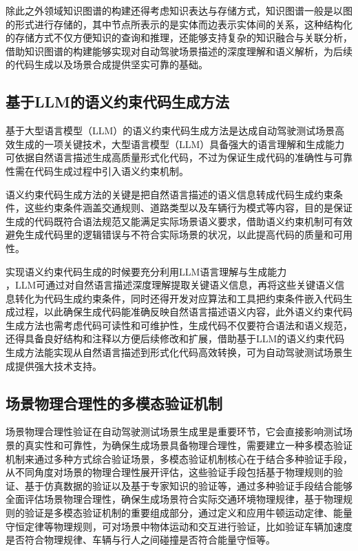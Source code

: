 除此之外领域知识图谱的构建还得考虑知识表达与存储方式，知识图谱一般是以图的形式进行存储的\cite{Yao2022React}，其中节点所表示的是实体而边表示实体间的关系，这种结构化的存储方式不仅方便知识的查询和推理，还能够支持复杂的知识融合与关联分析，借助知识图谱的构建能够实现对自动驾驶场景描述的深度理解和语义解析，为后续的代码生成以及场景合成提供坚实可靠的基础。

\subsection{基于LLM的语义约束代码生成方法}
基于大型语言模型（LLM）的语义约束代码生成方法是达成自动驾驶测试场景高效生成的一项关键技术，大型语言模型（LLM）具备强大的语言理解和生成能力可依据自然语言描述生成高质量形式化代码，不过为保证生成代码的准确性与可靠性需在代码生成过程中引入语义约束机制\cite{Zhang2023CAT}。

语义约束代码生成方法的关键是把自然语言描述的语义信息转成代码生成约束条件，这些约束条件涵盖交通规则、道路类型以及车辆行为模式等内容，目的是保证生成的代码既符合语法规范又能满足实际场景语义要求\cite{Zhang2022AdversarialRobustness}，借助语义约束机制可有效避免生成代码里的逻辑错误与不符合实际场景的状况，以此提高代码的质量和可用性。

实现语义约束代码生成的时候要充分利用LLM语言理解与生成能力\\ \cite{Zheng2023JudgingLLM}，LLM可通过对自然语言描述深度理解提取关键语义信息，再将这些关键语义信息转化为代码生成约束条件，同时还得开发对应算法和工具把约束条件嵌入代码生成过程，以此确保生成代码能准确反映自然语言描述语义内容，此外语义约束代码生成方法也需考虑代码可读性和可维护性，生成代码不仅要符合语法和语义规范，还得具备良好结构和注释以方便后续修改和扩展，借助基于LLM的语义约束代码生成方法能实现从自然语言描述到形式化代码高效转换\cite{zhong2023language}，可为自动驾驶测试场景生成提供强大技术支持。

\subsection{场景物理合理性的多模态验证机制}
场景物理合理性验证在自动驾驶测试场景生成里是重要环节\cite{zhao2025key}，它会直接影响测试场景的真实性和可靠性，为确保生成场景具备物理合理性，需要建立一种多模态验证机制来通过多种方式综合验证场景，多模态验证机制核心在于结合多种验证手段，从不同角度对场景的物理合理性展开评估，这些验证手段包括基于物理规则的验证、基于仿真数据的验证以及基于专家知识的验证等，通过多种验证手段结合能够全面评估场景物理合理性，确保生成场景符合实际交通环境物理规律\cite{Yao2022React}，基于物理规则的验证是多模态验证机制的重要组成部分，通过定义和应用牛顿运动定律、能量守恒定律等物理规则，可对场景中物体运动和交互进行验证，比如验证车辆加速度是否符合物理规律、车辆与行人之间碰撞是否符合能量守恒等。

